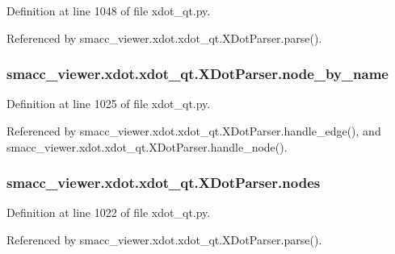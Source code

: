 Definition at line 1048 of file xdot\+\_\+qt.\+py.



Referenced by smacc\+\_\+viewer.\+xdot.\+xdot\+\_\+qt.\+X\+Dot\+Parser.\+parse().

\subsubsection[{\texorpdfstring{node\+\_\+by\+\_\+name}{node_by_name}}]{\setlength{\rightskip}{0pt plus 5cm}smacc\+\_\+viewer.\+xdot.\+xdot\+\_\+qt.\+X\+Dot\+Parser.\+node\+\_\+by\+\_\+name}\hypertarget{classsmacc__viewer_1_1xdot_1_1xdot__qt_1_1XDotParser_ab2f76c5c90e5bfea7a8f539698180c97}{}\label{classsmacc__viewer_1_1xdot_1_1xdot__qt_1_1XDotParser_ab2f76c5c90e5bfea7a8f539698180c97}


Definition at line 1025 of file xdot\+\_\+qt.\+py.



Referenced by smacc\+\_\+viewer.\+xdot.\+xdot\+\_\+qt.\+X\+Dot\+Parser.\+handle\+\_\+edge(), and smacc\+\_\+viewer.\+xdot.\+xdot\+\_\+qt.\+X\+Dot\+Parser.\+handle\+\_\+node().

\subsubsection[{\texorpdfstring{nodes}{nodes}}]{\setlength{\rightskip}{0pt plus 5cm}smacc\+\_\+viewer.\+xdot.\+xdot\+\_\+qt.\+X\+Dot\+Parser.\+nodes}\hypertarget{classsmacc__viewer_1_1xdot_1_1xdot__qt_1_1XDotParser_a4f80a4efa17b95021d3b9ac0798f21d3}{}\label{classsmacc__viewer_1_1xdot_1_1xdot__qt_1_1XDotParser_a4f80a4efa17b95021d3b9ac0798f21d3}


Definition at line 1022 of file xdot\+\_\+qt.\+py.



Referenced by smacc\+\_\+viewer.\+xdot.\+xdot\+\_\+qt.\+X\+Dot\+Parser.\+parse().

